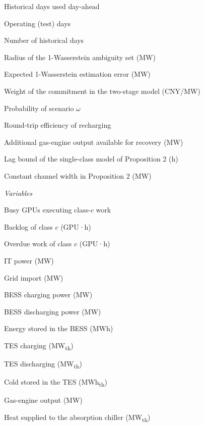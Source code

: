 \documentclass[a4paper,twocolumn,fleqn,10pt]{article}
\begin{document}
{\begin{nomlist}
\item[{\(\Omega^{DA}\)}] Historical days used day-ahead
\item[{\(\Omega\)}] Operating (test) days
\item[{\(N\)}] Number of historical days
\item[{\(\varepsilon\)}] Radius of the 1-Wasserstein ambiguity set (MW)
\item[{\(\varepsilon_N\)}] Expected 1-Wasserstein estimation error (MW)
\item[{\(\epsilon^{C}\)}] Weight of the commitment in the two-stage model (CNY/MW)
\item[{\(p_\omega\)}] Probability of scenario \(\omega\)
\item[{\(\eta\)}] Round-trip efficiency of recharging
\item[{\(g\)}] Additional gas-engine output available for recovery (MW)
\item[{\(L\)}] Lag bound of the single-class model of Proposition 2 (h)
\item[{\(h\)}] Constant channel width in Proposition 2 (MW)
\end{nomlist}
\par\vspace{3pt}\noindent\textit{Variables}\par
\begin{nomlist}
\item[{\(y_{c,t}\)}] Busy GPUs executing class-\(c\) work
\item[{\(B_{c,t}\)}] Backlog of class \(c\) (GPU·h)
\item[{\(v_{c,t}\)}] Overdue work of class \(c\) (GPU·h)
\item[{\(P^{IT}_t\)}] IT power (MW)
\item[{\(P^{grid}_t\)}] Grid import (MW)
\item[{\(P^{ch}_t\)}] BESS charging power (MW)
\item[{\(P^{dis}_t\)}] BESS discharging power (MW)
\item[{\(E_t\)}] Energy stored in the BESS (MWh)
\item[{\(Q^{TC}_t\)}] TES charging (MW\textsubscript{th})
\item[{\(Q^{TD}_t\)}] TES discharging (MW\textsubscript{th})
\item[{\(S_t\)}] Cold stored in the TES (MWh\textsubscript{th})
\item[{\(P^{GT}_t\)}] Gas-engine output (MW)
\item[{\(H^{AC}_t\)}] Heat supplied to the absorption chiller (MW\textsubscript{th})

\end{nomlist}}
\end{document}
